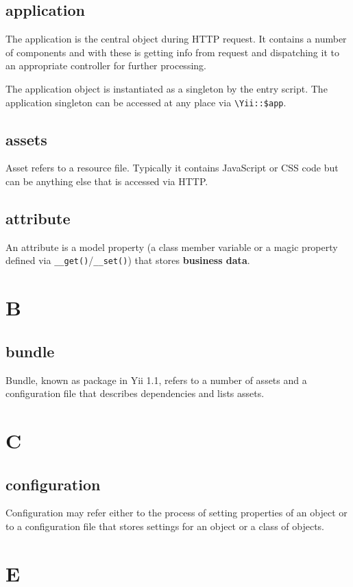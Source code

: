 \subsection{application}
The application is the central object during HTTP request. It contains a number of components and with these is getting info from request and dispatching it to an appropriate controller for further processing.

The application object is instantiated as a singleton by the entry script. The application singleton can be accessed at any place via \lstinline|\Yii::$app|.

\subsection{assets}
Asset refers to a resource file. Typically it contains JavaScript or CSS code but can be anything else that is accessed via HTTP.

\subsection{attribute}
An attribute is a model property (a class member variable or a magic property defined via \lstinline|__get()|/\lstinline|__set()|) that stores \textbf{business data}.

\section{B}
\subsection{bundle}
Bundle, known as package in Yii 1.1, refers to a number of assets and a configuration file that describes dependencies and lists assets.

\section{C}
\subsection{configuration}
Configuration may refer either to the process of setting properties of an object or to a configuration file that stores settings for an object or a class of objects.

\section{E}
